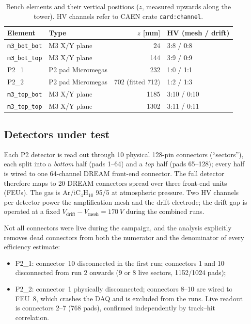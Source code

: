 \documentclass[11pt,a4paper]{article}
\newcommand{\detone}{P2\_1}
\newcommand{\dettwo}{P2\_2}
\newcommand{\code}[1]{\texttt{#1}}
\begin{document}
\begin{table}[htb]
  \centering
  \caption{Bench elements and their vertical positions ($z$, measured upwards
  along the tower). HV channels refer to CAEN crate \code{card:channel}.}
  \label{tab:geometry}
  \small
  \begin{tabular}{llrl}
    \toprule
    Element & Type & $z$ [mm] & HV (mesh / drift) \\
    \midrule
    \code{m3\_bot\_bot} & M3 X/Y plane & 24   & 3:8 / 0:8 \\
    \code{m3\_bot\_top} & M3 X/Y plane & 144  & 3:9 / 0:9 \\
    \detone{}           & P2 pad Micromegas & 232 & 1:0 / 1:1 \\
    \dettwo{}           & P2 pad Micromegas & 702 (fitted 712) & 1:2 / 1:3 \\
    \code{m3\_top\_bot} & M3 X/Y plane & 1185 & 3:10 / 0:10 \\
    \code{m3\_top\_top} & M3 X/Y plane & 1302 & 3:11 / 0:11 \\
    \bottomrule
  \end{tabular}
\end{table}

\subsection{Detectors under test}

Each P2 detector is read out through 10 physical 128-pin connectors
(``sectors''), each split into a \emph{bottom} half (pads 1--64) and a
\emph{top} half (pads 65--128); every half is wired to one 64-channel DREAM
front-end connector. The full detector therefore maps to 20 DREAM connectors
spread over three front-end units (FEUs). The gas is
Ar/iC$_4$H$_{10}$ 95/5 at atmospheric pressure. Two HV channels per detector
power the amplification mesh and the drift electrode; the drift gap is
operated at a fixed $V_\text{drift} - V_\text{mesh} = \SI{170}{V}$ during the
combined runs.

Not all connectors were live during the campaign, and the analysis explicitly
removes dead connectors from both the numerator and the denominator of every
efficiency estimate:

\begin{itemize}[itemsep=2pt]
  \item \detone{}: connector~10 disconnected in the first run; connectors 1
        and 10 disconnected from run 2 onwards (9 or 8 live sectors,
        1152/1024 pads);
  \item \dettwo{}: connector~1 physically disconnected; connectors 8--10 are
        wired to FEU~8, which crashes the DAQ and is excluded from the runs.
        Live readout is connectors 2--7 (768 pads), confirmed independently
        by track--hit correlation.
\end{itemize}
\end{document}
